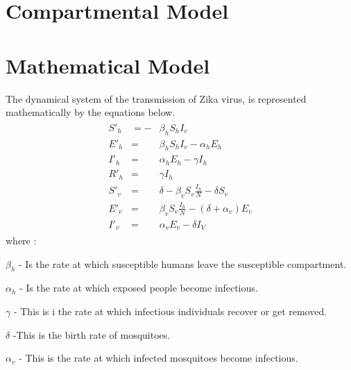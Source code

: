 \section{Compartmental Model}


\section{Mathematical Model}

The dynamical system of the transmission of Zika virus, is represented mathematically by the equations below.
\begin{align}
\begin{array}{lcl}  S'_h & = -&\beta_h S_h I_v  \\ E'_h & = & \beta_h S_h I_v - \alpha_h E_h  
\\ I'_h &= &\alpha_h E_h - \gamma I_h 
\\ R'_h &=& \gamma I_h 
\\ 
S'_v &=& \delta -\beta_v S_v \frac{I_h}{N} - \delta S_v
\\ E'_v & = & \beta_v S_v \frac{I_h}{N} - (\delta + \alpha_v) E_v
\\ I'_v & = &\alpha_v E_v - \delta I_V
 \end{array}
\end{align}
where :

$\beta_h$  - Is the rate at which susceptible humans leave the susceptible compartment.

$\alpha_h$ -  Is the rate at which exposed people become infectious.

$\gamma$ - This is i the rate at which infectious individuals recover or get removed.

$\delta$ -This is the birth rate of mosquitoes.

$\alpha_v$ - This is the rate at which infected mosquitoes become infectious.

